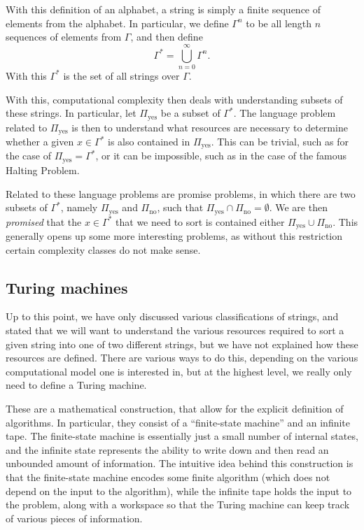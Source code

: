 \documentclass[../thesis-main/thesis-main]{subfiles}
\begin{document}
With this definition of an alphabet, a string is simply a finite sequence of elements from the alphabet.  In particular, we define $\Gamma^n$ to be all length $n$ sequences of elements from $\Gamma$, and then define
\begin{equation}
  \Gamma^* = \bigcup_{n=0}^\infty \Gamma^n.
\end{equation}
With this $\Gamma^*$ is the set of all strings over $\Gamma$.

With this, computational complexity then deals with understanding subsets of these strings.  In particular, let $\Pi_{\text{yes}}$ be a subset of $\Gamma^*$.  The language problem related to $\Pi_{\text{yes}}$ is then to understand what resources are necessary to determine whether a given $x\in \Gamma^*$ is also contained in $\Pi_{\text{yes}}$.  This can be trivial, such as for the case of $\Pi_{\text{yes}} = \Gamma^*$, or it can be impossible, such as in the case of the famous Halting Problem.


Related to these language problems are promise problems, in which there are two subsets of $\Gamma^*$, namely $\Pi_{\text{yes}}$ and $\Pi_{\text{no}}$, such that $\Pi_{\text{yes}} \cap \Pi_{\text{no}} = \emptyset$.  We are then \emph{promised} that the $x\in \Gamma^*$ that we need to sort is contained either $\Pi_{\text{yes}} \cup \Pi_{\text{no}}$.  This generally opens up some more interesting problems, as without this restriction certain complexity classes do not make sense.

\subsection{Turing machines}

Up to this point, we have only discussed various classifications of strings, and stated that we will want to understand the various resources required to sort a given string into one of two different strings, but we have not explained how these resources are defined.  There are various ways to do this, depending on the various computational model one is interested in, but at the highest level, we really only need to define a Turing machine.

These are a mathematical construction, that allow for the explicit definition of algorithms.  In particular, they consist of a ``finite-state machine'' and an infinite tape.  The finite-state machine is essentially just a small number of internal states, and the infinite state represents the ability to write down and then read an unbounded amount of information.  The intuitive idea behind this construction is that the finite-state machine encodes some finite algorithm (which does not depend on the input to the algorithm), while the infinite tape holds the input to the problem, along with a workspace so that the Turing machine can keep track of various pieces of information.
\end{document}
